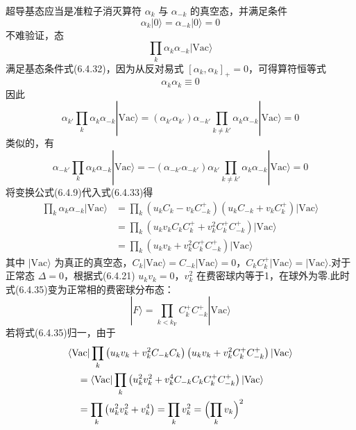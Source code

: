 超导基态应当是准粒子消灭算符 $\alpha_{k}$ 与 $\alpha_{-k}$ 的真空态，并满足条件
\begin{equation}
  \alpha_{k}|0\rangle=\alpha_{-k}|0\rangle=0
\end{equation}
不难验证，态
\begin{equation}
  \prod_{k}\alpha_{k}\alpha_{-k}|\mathrm{Vac}\rangle
\end{equation}
满足基态条件式(6.4.32)，因为从反对易式 $\left[\alpha_{k},\alpha_{k}\right]_{+}=0$，可得算符恒等式
\begin{equation}
  \alpha_{k}\alpha_{k}\equiv0
\end{equation}
因此
\begin{equation*}
  \alpha_{k'}\prod_{k}\alpha_{k}\alpha_{-k}|\mathrm{Vac}\rangle
  =\left(\alpha_{k'}\alpha_{k'}\right)\alpha_{-k'}
  \prod_{k\neq k'}\alpha_{k}\alpha_{-k}|\mathrm{Vac}\rangle=0
\end{equation*}
类似的，有
\begin{equation*}
  \alpha_{-k'}\prod_{k}\alpha_{k}\alpha_{-k}|\mathrm{Vac}\rangle
  =-\left(\alpha_{-k'}\alpha_{-k'}\right)\alpha_{k'}
  \prod_{k\neq k'}\alpha_{k}\alpha_{-k}|\mathrm{Vac}\rangle=0
\end{equation*}
将变换公式(6.4.9)代入式(6.4.33)得
\begin{equation}
\begin{aligned}
  \prod_{k}\alpha_{k}\alpha_{-k}|\mathrm{Vac}\rangle
  &=\prod_{k}\left(u_{k}C_{k}-v_{k}C^{+}_{-k}\right)
  \left(u_{k}C_{-k}+v_{k}C^{+}_{k}\right)|\mathrm{Vac}\rangle\\
  &=\prod_{k}\left(u_{k}v_{k}C_{k}C^{+}_{k}
  +v_{k}^{2}C^{+}_{k}C^{+}_{-k}\right)|\mathrm{Vac}\rangle\\
  &=\prod_{k}\left(u_{k}v_{k}
  +v_{k}^{2}C^{+}_{k}C^{+}_{-k}\right)|\mathrm{Vac}\rangle
\end{aligned}
\end{equation}
其中 $|\mathrm{Vac}\rangle$ 为真正的真空态，$C_{k}|\mathrm{Vac}\rangle=C_{-k}|\mathrm{Vac}\rangle=0$，$C_{k}C^{+}_{k}|\mathrm{Vac}\rangle=|\mathrm{Vac}\rangle$.对于正常态 $\Delta=0$，根据式(6.4.21) $u_{k}v_{k}=0$，$v_{k}^{2}$ 在费密球内等于1，在球外为零.此时式(6.4.35)变为正常相的费密球分布态：
\begin{equation}
  |F\rangle=\prod_{k<k_{\mathrm{F}}}C^{+}_{k}C^{+}_{-k}|\mathrm{Vac}\rangle
\end{equation}
若将式(6.4.35)归一，由于
\begin{equation}
\begin{aligned}
  &\langle\mathrm{Vac}|\prod_{k}\left(u_{k}v_{k}+v_{k}^{2}C_{-k}C_{k}\right)
  \left(u_{k}v_{k}+v_{k}^{2}C^{+}_{k}C^{+}_{-k}\right)|\mathrm{Vac}\rangle\\
  &\quad=\langle\mathrm{Vac}|\prod_{k}\left(u_{k}^{2}v_{k}^{2}
  +v_{k}^{4}C_{-k}C_{k}C^{+}_{k}C^{+}_{-k}\right)|\mathrm{Vac}\rangle\\
  &\quad=\prod_{k}\left(u_{k}^{2}v_{k}^{2}+v_{k}^{4}\right)
  =\prod_{k}v_{k}^{2}=\Bigl(\prod_{k}v_{k}\Bigr)^{2}
\end{aligned}
\end{equation}
